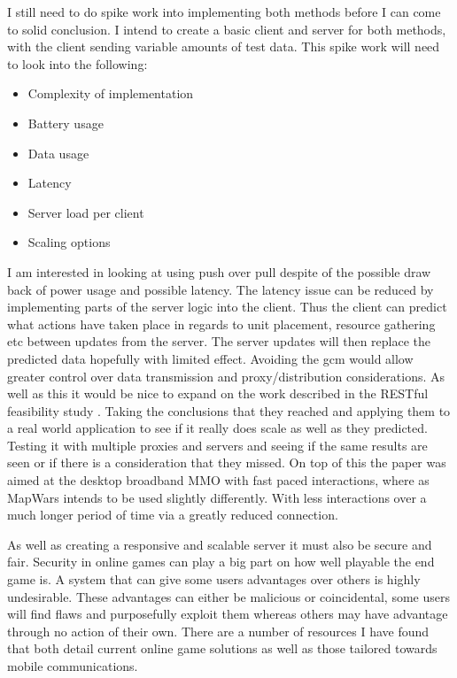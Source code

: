 \documentclass[11pt,fleqn,twoside]{article}
\begin{document}
I still need to do spike work into implementing both methods before I can come to solid conclusion. I intend to create a basic client and server for both methods, with the client sending variable amounts of test data. This spike work will need to look into the following:
\begin{itemize}
\item Complexity of implementation
\item Battery usage
\item Data usage
\item Latency
\item Server load per client
\item Scaling options
\end{itemize}
I am interested in looking at using \gls{push} over \gls{pull} despite of the possible draw back of power usage and possible latency. The latency issue can be reduced by implementing parts of the server logic into the client. Thus the client can predict what actions have taken place in regards to unit placement, resource gathering etc between updates from the server. The server updates will then replace the predicted data hopefully with limited effect. Avoiding the \gls{gcm} would allow greater control over data transmission and proxy/distribution considerations. As well as this it would be nice to expand on the work described in the RESTful feasibility study \cite{6329833}. Taking the conclusions that they reached and applying them to a real world application to see if it really does scale as well as they predicted. Testing it with multiple proxies and servers and seeing if the same results are seen or if there is a consideration that they missed. On top of this the paper was aimed at the desktop broadband MMO with fast paced interactions, where as MapWars intends to be used slightly differently. With less interactions over a much longer period of time via a greatly reduced connection.

As well as creating a responsive and scalable server it must also be secure and fair. Security in online games can play a big part on how well playable the end game is. A system that can give some users advantages over others is highly undesirable. These advantages can either be malicious or coincidental, some users will find flaws and purposefully exploit them whereas others may have advantage through no action of their own. There are a number of resources I have found that both detail current online game solutions\cite{sec2, sec3} as well as those tailored towards mobile communications\cite{sec1}.
\end{document}
